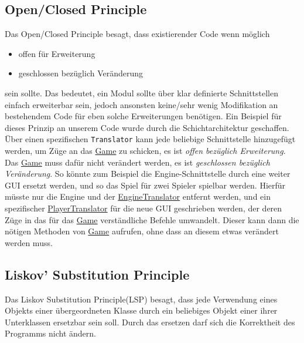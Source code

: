 \documentclass[
10pt, %
a4paper, %
oneside, %
headinclude,footinclude, %
BCOR5mm, %
]{scrartcl}
\begin{document}
\begin{onehalfspace}
\subsection{Open/Closed Principle}
Das Open/Closed Principle besagt, dass existierender Code wenn möglich
\begin{itemize}
	\item offen für Erweiterung
	\item geschlossen bezüglich Veränderung
\end{itemize}
sein sollte.
Das bedeutet, ein Modul sollte über klar definierte Schnittstellen einfach erweiterbar sein, jedoch ansonsten keine/sehr wenig Modifikation an bestehendem Code für eben solche Erweiterungen benötigen.
Ein Beispiel für dieses Prinzip an unserem Code wurde durch die Schichtarchitektur geschaffen. Über einen spezifischen \texttt{Translator} kann jede beliebige Schnittstelle hinzugefügt werden, um Züge an das \href{https://github.com/schmida736/Chess-AdvancedSE/blob/main/Chess-AdvancedSE/Game\%20Elements/Game.cs}{Game} zu schicken, es ist \textsl{offen bezüglich Erweiterung}. Das \href{https://github.com/schmida736/Chess-AdvancedSE/blob/main/Chess-AdvancedSE/Game\%20Elements/Game.cs}{Game} muss dafür nicht verändert werden, es ist \textsl{geschlossen bezüglich Veränderung}. So könnte zum Beispiel die Engine-Schnittstelle durch eine weiter GUI ersetzt werden, und so das Spiel für zwei Spieler spielbar werden. Hierfür müsste nur die Engine und der \href{https://github.com/schmida736/Chess-AdvancedSE/blob/main/Chess-AdvancedSE/Translators/EngineTranslator.cs}{EngineTranslator} entfernt werden, und ein spezifischer \href{https://github.com/schmida736/Chess-AdvancedSE/blob/main/Chess-AdvancedSE/Translators/PlayerTranslator.cs}{PlayerTranslator} für die neue GUI geschrieben werden, der deren Züge in das für das \href{https://github.com/schmida736/Chess-AdvancedSE/blob/main/Chess-AdvancedSE/Game\%20Elements/Game.cs}{Game} verständliche Befehle umwandelt. Dieser kann dann die nötigen Methoden von \href{https://github.com/schmida736/Chess-AdvancedSE/blob/main/Chess-AdvancedSE/Game\%20Elements/Game.cs}{Game} aufrufen, ohne dass an diesem etwas verändert werden muss.
\subsection{Liskov' Substitution Principle}
Das Liskov Substitution Principle(LSP) besagt, dass jede Verwendung eines Objekts einer übergeordneten Klasse durch ein beliebiges Objekt einer ihrer Unterklassen ersetzbar sein soll. Durch das ersetzen darf sich die Korrektheit des Programms nicht ändern.


\end{onehalfspace}
\end{document}
